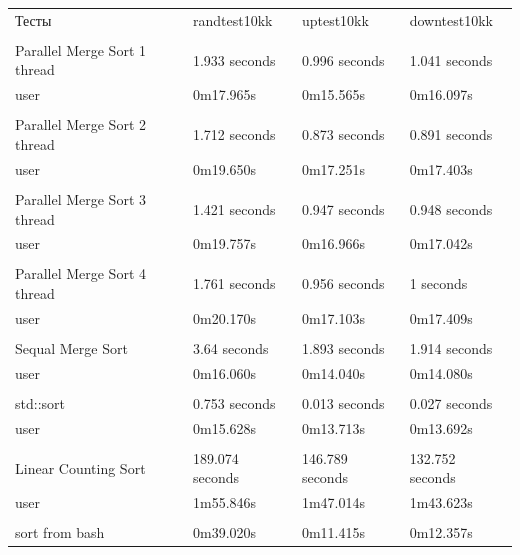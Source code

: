\begin{tabular}{ l l l l }
Тесты & randtest10kk & uptest10kk & downtest10kk \\
\\
Parallel Merge Sort 1 thread & 1.933 seconds & 0.996 seconds & 1.041 seconds \\
user & 0m17.965s& 0m15.565s & 0m16.097s & \\
\\
Parallel Merge Sort 2 thread & 1.712 seconds & 0.873 seconds & 0.891 seconds \\
user & 0m19.650s & 0m17.251s & 0m17.403s & \\
\\
Parallel Merge Sort 3 thread & 1.421 seconds & 0.947 seconds & 0.948 seconds \\
user & 0m19.757s & 0m16.966s & 0m17.042s \\
\\
Parallel Merge Sort 4 thread & 1.761 seconds & 0.956 seconds & 1 seconds \\
user & 0m20.170s & 0m17.103s & 0m17.409s \\
\\
Sequal Merge Sort & 3.64 seconds & 1.893 seconds & 1.914 seconds \\
user & 0m16.060s & 0m14.040s & 0m14.080s \\
\\
std::sort & 0.753 seconds & 0.013 seconds & 0.027 seconds \\
user & 0m15.628s & 0m13.713s & 0m13.692s \\
\\
Linear Counting Sort & 189.074 seconds & 146.789 seconds & 132.752 seconds \\
user & 1m55.846s & 1m47.014s & 1m43.623s \\
\\
sort from bash & 0m39.020s &  0m11.415s & 0m12.357s \\
\end{tabular}


